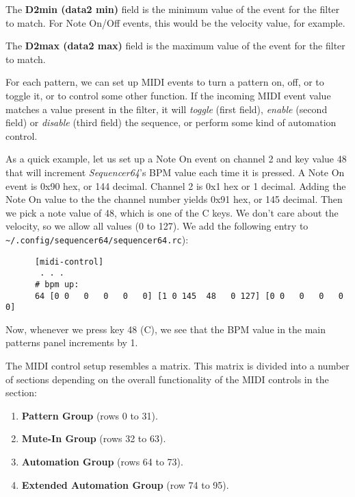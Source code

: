   The \textbf{D2min (data2 min)} field is the minimum value of the event for
   the filter to match. For Note On/Off events, this would be the velocity
   value, for example.

   The \textbf{D2max (data2 max)} field is the maximum value of the event for
   the filter to match.


   For each pattern, we can set up MIDI events to turn a 
   pattern on, off, or to toggle it, or to control some other function.
   If the incoming MIDI event value matches a value present in the filter, it
   will \textsl{toggle} (first field), \textsl{enable} (second field) or
   \textsl{disable} (third field) the sequence, or perform some kind of automation
   control.

   As a quick example, let us set up a Note On event on channel 2 and key value
   48 that will increment \textsl{Sequencer64}'s BPM value each time it is
   pressed.  A Note On event is 0x90 hex, or 144 decimal.  Channel 2 is 0x1 hex
   or 1 decimal.   Adding the Note On value to the the channel number yields
   0x91 hex, or 145 decimal.  Then we pick a note value of 48, which is one of
   the C keys.  We don't care about the velocity, so we allow all values (0 to
   127).  We add the following entry to
   \texttt{\textasciitilde/.config/sequencer64/sequencer64.rc}):

   \begin{verbatim}
      [midi-control]
       . . .
      # bpm up:
      64 [0 0   0   0   0   0] [1 0 145  48   0 127] [0 0   0   0   0   0]
   \end{verbatim}

   Now, whenever we press key 48 (C), we see that the BPM value in the main
   patterns panel increments by 1.

   The MIDI control setup resembles a matrix.  This matrix is divided into a
   number of sections depending on the overall functionality of the MIDI
   controls in the section:

   \begin{enumerate}
      \item \textbf{Pattern Group} (rows 0 to 31).
      \item \textbf{Mute-In Group} (rows 32 to 63).
      \item \textbf{Automation Group} (rows 64 to 73).
      \item \textbf{Extended Automation Group} (row 74 to 95).
   \end{enumerate}

